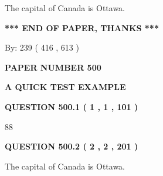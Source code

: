 \documentclass[12pt]{article}
\begin{document}
  
 
 
\noindent{}
 
 
The capital of Canada is Ottawa.
 
 
 
 
   
   
 \vspace{0.2in}
 
   
   
   
   
\vspace{1.0in} 
{\textbf{\large{ *** END OF PAPER, THANKS *** }}} 
   
   
\hspace{1.0in} By: 
 239 ( 416 ,  613 )
   
   
   
   
\newpage 
\setcounter{page}{ 
   500001 } 
   
   
   
   
 {\textbf{ \Large{ PAPER NUMBER  500  }}}
   
   
\vspace{0.2in}
   
   
   
   
   
   
 \vspace{0.2in}
{\LARGE {\textbf{ A QUICK TEST EXAMPLE}}}
   
   
  
\vspace{0.2in}
  
{\textbf{\Large{QUESTION
500.1 
 ( 1 , 1 , 101 )
}}}
  
  
 
 
\noindent{}

88
 
 
  
\vspace{0.2in}
  
{\textbf{\Large{QUESTION
500.2 
 ( 2 , 2 , 201 )
}}}
  
  
 
 
\noindent{}
 
 
The capital of Canada is Ottawa.
 
\end{document}
